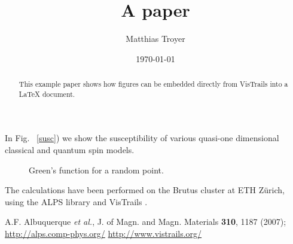 \documentclass[prl, superscriptaddress, showpacs, twocolumn]{revtex4}
\begin{document}
\title{A paper}
\author{Matthias Troyer}
\date{\today}

\begin{abstract}
This example paper shows how figures can be embedded directly from VisTrails into a LaTeX document.
\end{abstract}


\hyphenation{}

\maketitle

In Fig. ~\ref{susc}) we show the susceptibility of various quasi-one dimensional classical and quantum spin models.

\begin{figure}[h!]
\begin{center}
\vistrail[host=alps.ethz.ch,
db=vistrails,
vtid=3,
version=220,
tag=nice figure,
showspreadsheetonly]{}
\caption{Green's function for a random point.}
\label{green}
\end{center}
\end{figure}


\acknowledgments

The calculations have been performed on the Brutus  cluster at ETH Z{\"u}rich, using the ALPS library \cite{ALPS} and VisTrails  \cite{VisTrails} .

\begin{thebibliography}{9}
 A.F. Albuquerque {\it et al.}, J. of Magn. and Magn. Materials {\bf 310}, 1187 (2007); \url{http://alps.comp-phys.org/}
  \url{http://www.vistrails.org/}
\end{thebibliography}
\end{document}
